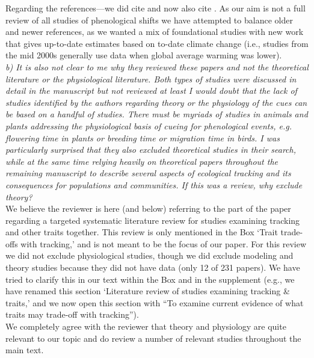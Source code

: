\documentclass[11pt,letterpaper]{article}
\begin{document}
Regarding the references---we did cite \citet{Menzel:2006xn} and now also cite \citet{Parmesan:2006cr}. As our aim is not a full review of all studies of phenological shifts we have attempted to balance older and newer references, as we wanted a mix of foundational studies with new work that gives up-to-date estimates based on to-date climate change (i.e., studies from the mid 2000s generally use data when global average warming was lower).\\

\emph{b) It is also not clear to me why they reviewed these papers and not the theoretical
literature or the physiological literature. Both types of studies were discussed in detail in
the manuscript but not reviewed at least I would doubt that the lack of studies identified
by the authors regarding theory or the physiology of the cues can be based on a handful of
studies. There must be myriads of studies in animals and plants addressing the physiological
basis of cueing for phenological events, e.g. flowering time in plants or breeding time or
migration time in birds. I was particularly surprised that they also excluded theoretical
studies in their search, while at the same time relying heavily on theoretical papers
throughout the remaining manuscript to describe several aspects of ecological tracking and
its consequences for populations and communities. If this was a review, why exclude theory?}\\

We believe the reviewer is here (and below) referring to the part of the paper regarding a targeted systematic literature review for studies examining tracking and other traits together. This review is only mentioned in the Box `Trait trade-offs with tracking,' and is not meant to be the focus of our paper. For this review we did not exclude physiological studies, though we did exclude modeling and theory studies because they did not have data (only 12 of 231 papers). We have tried to clarify this in our text within the Box and in the supplement (e.g., we have renamed this section `Literature review of studies examining tracking \& traits,' and we now open this section with ``To examine current evidence of what traits may trade-off with tracking''). \\

We completely agree with the reviewer that theory and physiology are quite relevant to our topic and do review a number of relevant studies throughout the main text.\\
\end{document}
